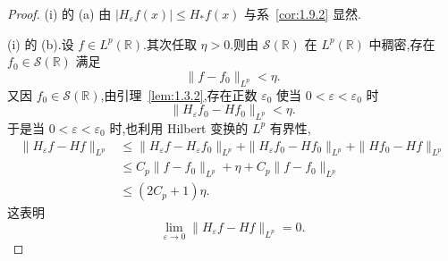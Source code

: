 \begin{proof}
(i) 的 (a) 由 $|H_{\varepsilon}f(x)| \leq H_{*}f(x)$ 与系~\ref{cor:1.9.2} 显然.

(i) 的 (b).设 $f \in L^{p}(\mathbb{R})$.其次任取 $\eta > 0$.则由 $\mathcal{S}(\mathbb{R})$ 在 $L^{p}(\mathbb{R})$ 中稠密,存在 $f_{0} \in \mathcal{S}(\mathbb{R})$ 满足
\begin{equation*}
\| f - f_{0} \|_{L^{p}} < \eta.
\end{equation*}
又因 $f_{0} \in \mathcal{S}(\mathbb{R})$,由引理~\ref{lem:1.3.2},存在正数 $\varepsilon_{0}$ 使当 $0 < \varepsilon < \varepsilon_{0}$ 时
\begin{equation*}
\| H_{\varepsilon}f_{0} - Hf_{0} \|_{L^{p}} < \eta.
\end{equation*}
于是当 $0 < \varepsilon < \varepsilon_{0}$ 时,也利用 Hilbert 变换的 $L^{p}$ 有界性,
\begin{align*}
\| H_{\varepsilon}f - Hf \|_{L^{p}} & \leq \| H_{\varepsilon}f - H_{\varepsilon}f_{0} \|_{L^{p}} + \| H_{\varepsilon}f_{0} - Hf_{0} \|_{L^{p}} + \| Hf_{0} - Hf \|_{L^{p}} \\
& \leq C_{p}\| f - f_{0} \|_{L^{p}} + \eta + C_{p}\| f - f_{0} \|_{L^{p}} \\
& \leq (2C_{p} + 1)\eta.
\end{align*}
这表明
\begin{equation*}
\lim_{\varepsilon \to 0}\| H_{\varepsilon}f - Hf \|_{L^{p}} = 0.
\end{equation*}


\end{proof}

